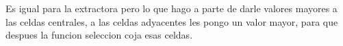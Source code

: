 Es igual para la extractora pero lo que hago a parte de darle valores mayores a las celdas centrales, a las celdas adyacentes les pongo un valor mayor, para que despues la funcion seleccion coja esas celdas. 
